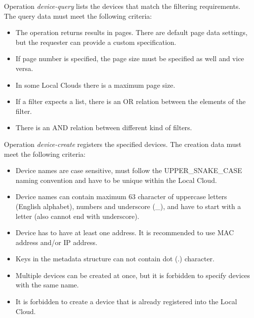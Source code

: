 \documentclass[a4paper]{arrowhead}
\begin{document}
{}

Operation \textit{device-query} lists the devices that match the filtering requirements. The query data must meet the following criteria:

\begin{itemize}
    \item The operation returns results in pages. There are default page data settings, but the requester can provide a custom specification.
    \item If page number is specified, the page size must be specified as well and vice versa.
    \item In some Local Clouds there is a maximum page size.
    \item If a filter expects a list, there is an OR relation between the elements of the filter.
    \item There is an AND relation between different kind of filters.
\end{itemize}


Operation \textit{device-create} registers the specified devices. The creation data must meet the following criteria:

\begin{itemize}
    \item Device names are case sensitive, must follow the UPPER\_SNAKE\_CASE naming convention and have to be unique within the Local Cloud.
    \item Device names can contain maximum 63 character of uppercase letters (English alphabet), numbers and underscore (\_), and have to start with a letter (also cannot end with underscore).
    \item Device has to have at least one address. It is recommended to use MAC address and/or IP address.
    \item Keys in the metadata structure can not contain dot (.) character.
    \item Multiple devices can be created at once, but it is forbidden to specify devices with the same name.
    \item It is forbidden to create a device that is already registered into the Local Cloud.
\end{itemize}

\end{document}

